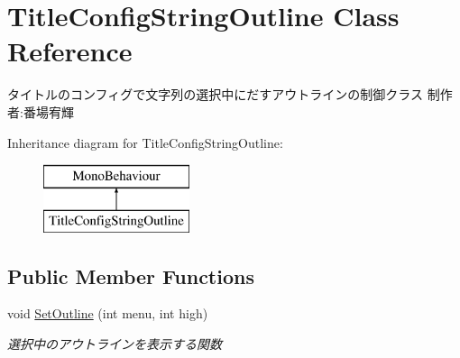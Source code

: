 \hypertarget{class_title_config_string_outline}{}\section{Title\+Config\+String\+Outline Class Reference}
\label{class_title_config_string_outline}


タイトルのコンフィグで文字列の選択中にだすアウトラインの制御クラス 制作者\+:番場宥輝  


Inheritance diagram for Title\+Config\+String\+Outline\+:\begin{figure}[H]
\begin{center}
\leavevmode
\includegraphics[height=2.000000cm]{class_title_config_string_outline}
\end{center}
\end{figure}
\subsection*{Public Member Functions}
\begin{DoxyCompactItemize}
\item 
void \hyperlink{class_title_config_string_outline_a664350bbd4db69b13598eab6e6e431e7}{Set\+Outline} (int menu, int high)
\begin{DoxyCompactList}\small\item\em 選択中のアウトラインを表示する関数 \end{DoxyCompactList}\end{DoxyCompactItemize}
